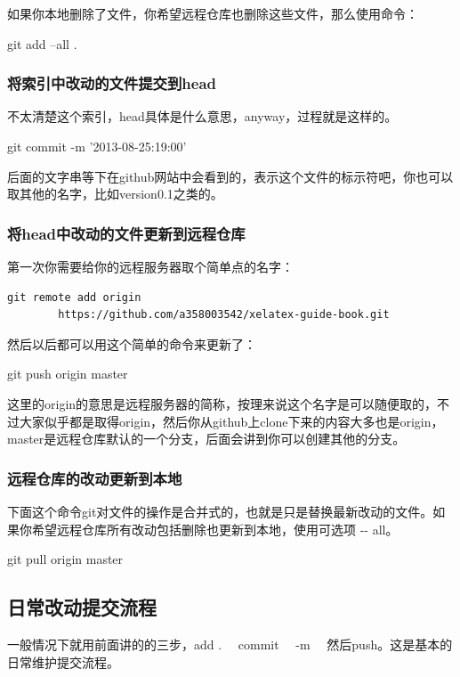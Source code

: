 \documentclass[12pt,oneside]{book}
\begin{document}
\begin{common-format}
如果你本地删除了文件，你希望远程仓库也删除这些文件，那么使用命令：
\begin{tcbbash}[]
git  add  --all   .  
\end{tcbbash}


\subsubsection{将索引中改动的文件提交到head}
不太清楚这个索引，head具体是什么意思，anyway，过程就是这样的。
\begin{tcbbash}[]
git  commit   -m  '2013-08-25:19:00' 
\end{tcbbash}
后面的文字串等下在github网站中会看到的，表示这个文件的标示符吧，你也可以取其他的名字，比如version0.1之类的。

\subsubsection{将head中改动的文件更新到远程仓库}
第一次你需要给你的远程服务器取个简单点的名字：
\begin{Verbatim}
git remote add origin 
        https://github.com/a358003542/xelatex-guide-book.git
\end{Verbatim}


然后以后都可以用这个简单的命令来更新了：
\begin{tcbbash}[]
git  push  origin  master
\end{tcbbash}

这里的origin的意思是远程服务器的简称，按理来说这个名字是可以随便取的，不过大家似乎都是取得origin，然后你从github上clone下来的内容大多也是origin，master是远程仓库默认的一个分支，后面会讲到你可以创建其他的分支。

\subsubsection{远程仓库的改动更新到本地}
下面这个命令git对文件的操作是合并式的，也就是只是替换最新改动的文件。如果你希望远程仓库所有改动包括删除也更新到本地，使用可选项 -{}- all。
\begin{tcbbash}[]
git  pull origin master
\end{tcbbash}


\subsection{日常改动提交流程}
一般情况下就用前面讲的的三步，add .~~ commit ~~-m~~ 然后push。这是基本的日常维护提交流程。


\end{common-format}
\end{document}
